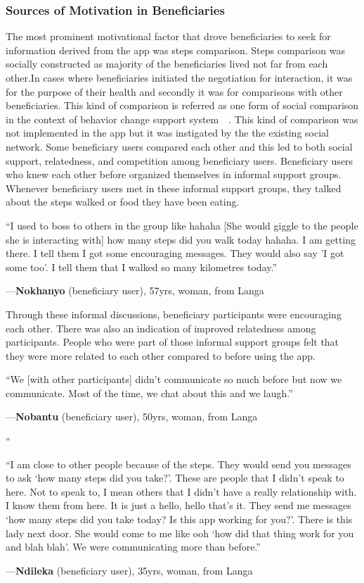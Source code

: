 \documentclass{sig-alternate}
\newenvironment{myquote}
               {\list{}{\rightmargin   \leftmargin
                        \parsep        0in }%
                \item\relax}
               {\endlist}
\newcommand{\userquote}[2]{\begin{samepage}\begin{myquote} 
     \em{\small{#2\begin{flushright}---#1\end{flushright}}}
   \end{myquote}\end{samepage}}
\begin{document}
\subsubsection*{\textbf{Sources of Motivation in Beneficiaries}}

The most prominent motivational factor that drove beneficiaries to seek for
information derived from the app was steps comparison. Steps comparison was
socially constructed as majority of the beneficiaries lived not far from each
other.In cases where beneficiaries initiated the negotiation for interaction,
it was for the purpose of their health and secondly it was for comparisons
with other beneficiaries. This kind of comparison is referred as one form of
social comparison in the context of behavior change support 
system~~\cite{Oinas-kukkonen:psd}. This kind of comparison 
was not implemented in the app but it was instigated by the the existing social network. Some beneficiary users compared each other and this led to both social support, relatedness, and competition among beneficiary users. Beneficiary users who knew each other before organized themselves in informal support groups. Whenever beneficiary users met in these informal support groups, they talked about the steps walked or food they have been eating.

\userquote{\textbf{Nokhanyo} (beneficiary user), 57yrs, woman, from Langa}
{``I used to boss to others in the group like hahaha [She would giggle
 to the people she is interacting with] how many steps did you walk today 
 hahaha. I am getting there. I tell them I got some encouraging messages. 
 They would also say 'I got some too'. I tell them that I walked so many 
 kilometres today.''}
Through these informal discussions, beneficiary participants were encouraging
each other. There was also an indication of improved relatedness among
participants. People who were part of those informal support groups felt that
they were more related to each other compared to before using the app.

\userquote{\textbf{Nobantu} (beneficiary user), 50yrs, woman, from Langa} 
{``We [with other participants] didn't communicate so much before but 
now we communicate. Most of the time, we chat about this and we laugh.''}
``
\userquote{\textbf{Ndileka} (beneficiary user),  35yrs, woman, from Langa}
{``I am close to other people because of the steps. They would send 
you messages to ask `how many steps did you take?'. These are people that I 
didn't speak to here. Not to speak to, I mean others that I didn't have a 
really relationship with. I know them from here. It is just a hello, hello 
that's it. They send me messages `how many steps did you take today? Is this 
app working for you?'. There is this lady next door. She would come to me 
like ooh `how did that thing work for you and blah blah'. We were 
communicating more than before.''}
\end{document}
